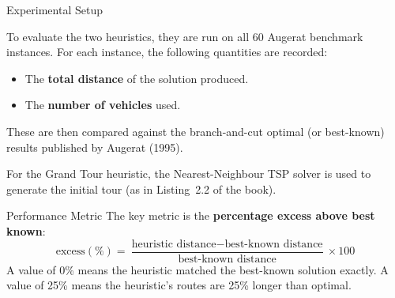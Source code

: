 \documentclass[aspectratio=169,10pt]{beamer}
\begin{document}
\begin{frame}[allowframebreaks]{Experimental Setup}

  To evaluate the two heuristics, they are run on all 60 Augerat benchmark
  instances.  For each instance, the following quantities are recorded:
  \begin{itemize}
    \item The \textbf{total distance} of the solution produced.
    \item The \textbf{number of vehicles} used.
  \end{itemize}
  These are then compared against the branch-and-cut optimal (or best-known)
  results published by Augerat (1995).

  \bigskip
  For the Grand Tour heuristic, the Nearest-Neighbour TSP solver is used to
  generate the initial tour (as in Listing~2.2 of the book).

  \bigskip
  \begin{block}{Performance Metric}
    The key metric is the \textbf{percentage excess above best known}:
    \[
      \text{excess}(\%) = \frac{\text{heuristic distance} - \text{best-known distance}}
                               {\text{best-known distance}} \times 100
    \]
    A value of 0\% means the heuristic matched the best-known solution exactly.
    A value of 25\% means the heuristic's routes are 25\% longer than optimal.
  \end{block}

\end{frame}
\end{document}
